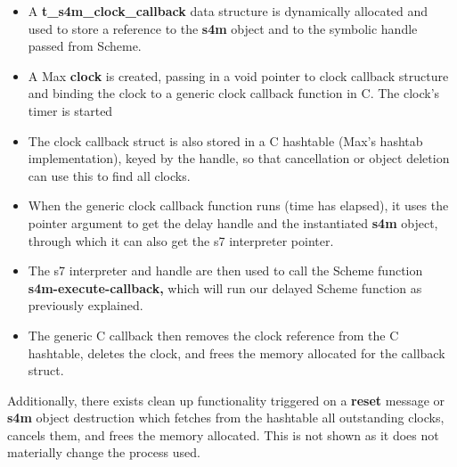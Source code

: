 \documentclass[acmsmall]{acmart}
\begin{document}
\begin{itemize}
\item A \textbf{t\_s4m\_clock\_callback} data structure is dynamically allocated and used to store a
  reference to the \textbf{s4m} object and to the symbolic handle passed from Scheme.
\item A Max \textbf{clock} is created, passing in a void pointer to clock callback structure
  and binding the clock to a generic clock callback function in C. The clock's timer is started
\item The clock callback struct is also stored in a C hashtable (Max's hashtab implementation),
  keyed by the handle, so that cancellation or object deletion can use this to find all clocks.
\item When the generic clock callback function runs (time has elapsed), it uses the pointer argument to get 
  the delay handle and the instantiated \textbf{s4m} object, through which it 
  can also get the s7 interpreter pointer.
\item The s7 interpreter and handle are then used to call the Scheme function
  \textbf{s4m-execute-callback,} which will run our delayed Scheme function as previously explained.
\item The generic C callback then removes the clock reference from the C hashtable,
  deletes the clock, and frees the memory allocated for the callback struct.
\end{itemize}

Additionally, there exists clean up functionality triggered on a \textbf{reset} message or 
\textbf{s4m} object destruction which fetches from the hashtable all outstanding clocks, 
cancels them, and frees the memory allocated.
This is not shown as it does not materially change the process used.
\end{document}
